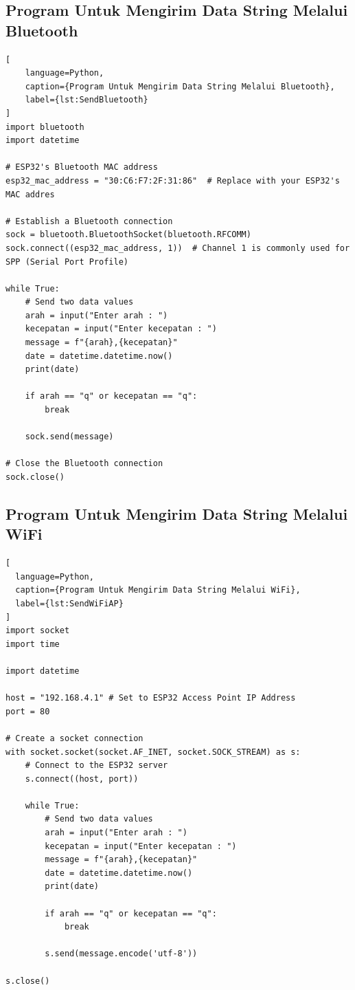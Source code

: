 \subsection{Program Untuk Mengirim Data String Melalui Bluetooth}

\begin{lstlisting}[
    language=Python,
    caption={Program Untuk Mengirim Data String Melalui Bluetooth},
    label={lst:SendBluetooth}
]
import bluetooth
import datetime

# ESP32's Bluetooth MAC address
esp32_mac_address = "30:C6:F7:2F:31:86"  # Replace with your ESP32's MAC addres

# Establish a Bluetooth connection
sock = bluetooth.BluetoothSocket(bluetooth.RFCOMM)
sock.connect((esp32_mac_address, 1))  # Channel 1 is commonly used for SPP (Serial Port Profile)

while True:
    # Send two data values
    arah = input("Enter arah : ")
    kecepatan = input("Enter kecepatan : ")
    message = f"{arah},{kecepatan}"
    date = datetime.datetime.now()
    print(date)
    
    if arah == "q" or kecepatan == "q":
        break
    
    sock.send(message)

# Close the Bluetooth connection
sock.close()

\end{lstlisting}

\subsection{Program Untuk Mengirim Data String Melalui WiFi}

\begin{lstlisting}[
  language=Python,
  caption={Program Untuk Mengirim Data String Melalui WiFi},
  label={lst:SendWiFiAP}
]
import socket
import time

import datetime

host = "192.168.4.1" # Set to ESP32 Access Point IP Address
port = 80

# Create a socket connection
with socket.socket(socket.AF_INET, socket.SOCK_STREAM) as s:
    # Connect to the ESP32 server
    s.connect((host, port))
    
    while True:
        # Send two data values
        arah = input("Enter arah : ")
        kecepatan = input("Enter kecepatan : ")
        message = f"{arah},{kecepatan}"
        date = datetime.datetime.now()
        print(date)
    
        if arah == "q" or kecepatan == "q":
            break
    
        s.send(message.encode('utf-8'))
        
s.close()

\end{lstlisting}

